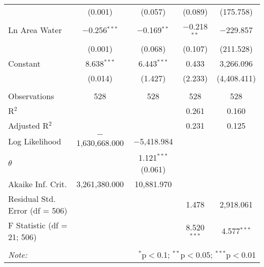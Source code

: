 \begin{table}[!htbp]
\begin{tabular}{@{\extracolsep{5pt}}lcccc}
  & (0.001) & (0.057) & (0.089) & (175.758) \\ 
  Ln Area Water & $-$0.256$^{***}$ & $-$0.169$^{**}$ & $-$0.218$^{**}$ & $-$229.857 \\ 
  & (0.001) & (0.068) & (0.107) & (211.528) \\ 
  Constant & 8.638$^{***}$ & 6.443$^{***}$ & 0.433 & 3,266.096 \\ 
  & (0.014) & (1.427) & (2.233) & (4,408.411) \\ 
 \hline \\[-1.8ex] 
Observations & 528 & 528 & 528 & 528 \\ 
R$^{2}$ &  &  & 0.261 & 0.160 \\ 
Adjusted R$^{2}$ &  &  & 0.231 & 0.125 \\ 
Log Likelihood & $-$1,630,668.000 & $-$5,418.984 &  &  \\ 
$\theta$ &  & 1.121$^{***}$  (0.061) &  &  \\ 
Akaike Inf. Crit. & 3,261,380.000 & 10,881.970 &  &  \\ 
Residual Std. Error (df = 506) &  &  & 1.478 & 2,918.061 \\ 
F Statistic (df = 21; 506) &  &  & 8.520$^{***}$ & 4.577$^{***}$ \\ 
\hline 
\hline \\[-1.8ex] 
\textit{Note:}  & \multicolumn{4}{r}{$^{*}$p$<$0.1; $^{**}$p$<$0.05; $^{***}$p$<$0.01} \\ 
\end{tabular} 
\end{table} 
